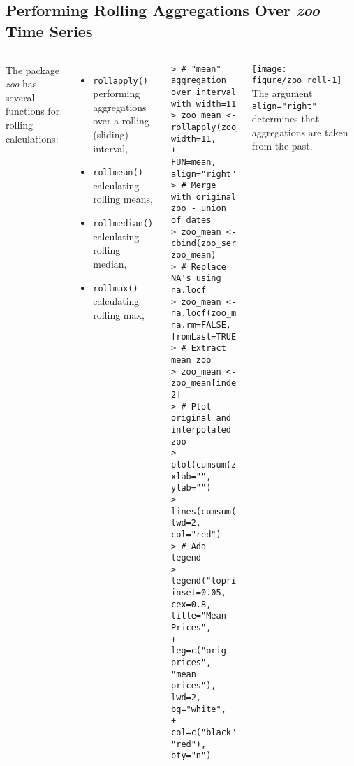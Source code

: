 \documentclass[10pt]{beamer}\usepackage[]{graphicx}\usepackage[]{color}
\makeatletter
\newenvironment{kframe}{%
 \def\at@end@of@kframe{}%
 \ifinner\ifhmode%
  \def\at@end@of@kframe{\end{minipage}}%
  \begin{minipage}{\columnwidth}%
 \fi\fi%
 \def\FrameCommand##1{\hskip\@totalleftmargin \hskip-\fboxsep
 \colorbox{shadecolor}{##1}\hskip-\fboxsep
     \hskip-\linewidth \hskip-\@totalleftmargin \hskip\columnwidth}%
 \MakeFramed {\advance\hsize-\width
   \@totalleftmargin\z@ \linewidth\hsize
   \@setminipage}}%
 {\par\unskip\endMakeFramed%
 \at@end@of@kframe}
\newenvironment{knitrout}{}{} %
\makeatother
\begin{document}
\subsection{Performing Rolling Aggregations Over \protect\emph{zoo} Time Series}
\begin{frame}[fragile,t]{\subsecname}
\vspace{-1em}
\begin{block}{}
  \begin{columns}[T]
      The package \emph{zoo} has several functions for rolling calculations:
      \begin{itemize}
        \item \texttt{rollapply()} performing aggregations over a rolling (sliding) interval,
        \item \texttt{rollmean()} calculating rolling means,
        \item \texttt{rollmedian()} calculating rolling median,
        \item \texttt{rollmax()} calculating rolling max,
      \end{itemize}
      \vspace{-1em}
\begin{knitrout}\tiny
{}\color{fgcolor}\begin{kframe}
\begin{verbatim}
> # "mean" aggregation over interval with width=11
> zoo_mean <- rollapply(zoo_series, width=11,
+                 FUN=mean, align="right")
> # Merge with original zoo - union of dates
> zoo_mean <- cbind(zoo_series, zoo_mean)
> # Replace NA's using na.locf
> zoo_mean <- na.locf(zoo_mean, na.rm=FALSE, fromLast=TRUE)
> # Extract mean zoo
> zoo_mean <- zoo_mean[index(zoo_series), 2]
> # Plot original and interpolated zoo
> plot(cumsum(zoo_series), xlab="", ylab="")
> lines(cumsum(zoo_mean), lwd=2, col="red")
> # Add legend
> legend("topright", inset=0.05, cex=0.8, title="Mean Prices",
+  leg=c("orig prices", "mean prices"), lwd=2, bg="white",
+  col=c("black", "red"), bty="n")
\end{verbatim}
\end{kframe}
\end{knitrout}
      \texttt{[image: figure/zoo\_roll-1]}
      \vspace{-3em}
      The argument \texttt{align="right"} determines that aggregations are taken from the past,
  \end{columns}
\end{block}

\end{frame}
\end{document}
